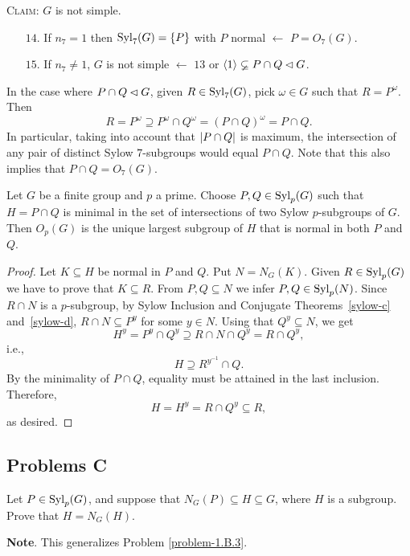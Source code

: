 \begin{xmpl}
\begin{enumerate}
    \end{enumerate}
    \textsc{Claim: }$G$ is not simple.
    \begin{enumerate}
        \item[$14$.] If\/ $n_7=1$ then\/ ${\rm Syl}_7(G)=\{P\}$ with $P$ normal $\leftarrow$ $P=O_7(G)$.
        \item[$15$.] If\/ $n_7\ne1$, $G$ is not simple $\leftarrow$ {\rm $13$ or $\langle1\rangle\varsubsetneq P\cap Q\lhd G$}.
    \end{enumerate}
    In the case where $P\cap Q\lhd G$, given $R\in{\rm Syl}_7(G)$, pick $\omega\in G$ such that $R=P^\omega$. Then
    $$
        R=P^\omega\supseteq P^\omega\cap Q^\omega=(P\cap Q)^\omega=P\cap Q.
    $$
    In particular, taking into account that $\left\vert{P\cap Q}\right\vert$ is maximum, the intersection of any pair of distinct Sylow $7$-subgroups would equal $P\cap Q$. Note that this also implies that $P\cap Q=O_7(G)$.
\end{xmpl}

\begin{thm}
    Let $G$ be a finite group and $p$ a prime. Choose $P, Q \in {\rm Syl}_p(G)$ such that $H = P\cap Q$ is minimal in the set of intersections of two Sylow $p$-subgroups of\/ $G$. Then $O_p(G)$ is the unique largest subgroup of $H$ that is normal in both $P$ and $Q$.
\end{thm}

\begin{proof} Let $K\subseteq H$ be normal in $P$ and $Q$. Put $N=N_G(K)$. Given $R\in{\rm Syl}_p(G)$ we have to prove that $K\subseteq R$. From $P,Q\subseteq N$ we infer $P,Q\in{\rm Syl}_p(N)$. Since $R\cap N$ is a $p$-subgroup, by Sylow Inclusion and Conjugate Theorems~\ref{sylow-c} and~\ref{sylow-d}, $R\cap N\subseteq P^y$ for some $y\in N$. Using that $Q^y\subseteq N$, we get
$$
    H^y = P^y\cap Q^y \supseteq R\cap N\cap Q^y = R\cap Q^y,
$$
i.e.,
$$
    H \supseteq R^{y^{-1}}\cap Q.
$$
By the minimality of $P\cap Q$, equality must be attained in the last inclusion. Therefore,
$$
    H = H^y = R\cap Q^y \subseteq R,
$$
as desired.  \end{proof}



\subsection{Problems C}

\begin{probl}\label{problem-1.C.1}
    Let $P\in{\rm Syl}_p(G)$, and suppose that $N_G(P)\subseteq H \subseteq G$, where $H$ is a subgroup. Prove that $H = N_G(H)$.

    \textrm{\rm {\bf Note}. This generalizes Problem \ref{problem-1.B.3}}.
\end{probl}

